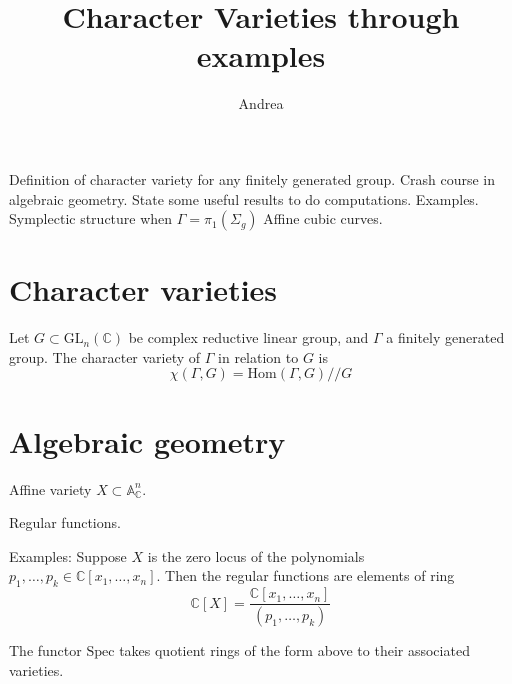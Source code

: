 
% 



\title{Character Varieties through examples}
\author{Andrea}
\date{}

 
\maketitle

Definition of character variety for any finitely generated group. 
Crash course in algebraic geometry.
State some useful results to do computations. 
Examples. 
Symplectic structure when $ \Gamma = \pi_1 ( \Sigma_g) $
Affine cubic curves. 

\section{Character varieties} %

\begin{definition}
    Let $ G \subset \mathrm{GL}_n (\mathbb{C} ) $ be complex reductive linear group, 
    and $ \Gamma $ a finitely generated group. 
    The character variety of $ \Gamma$ in relation to $G$ is 
    \begin{equation}
        \chi ( \Gamma, G) = \mathrm{Hom}( \Gamma, G) // G 
    \end{equation}
\end{definition}


\section{Algebraic geometry} %

\begin{definition}
    Affine variety  $ X \subset \mathbb{A}_\mathbb{C} ^n $.
\end{definition}

\begin{definition}
    Regular functions. 
\end{definition}

Examples: 
Suppose $X$ is the zero locus of the polynomials $p_1, \dots, p_k \in \mathbb{C} [x_1, \dots, x_n ] $. 
Then the regular functions are elements of ring 
\begin{equation}
    \mathbb{C}  [X] = \frac{\mathbb{C} [x_1, \dots, x_n ] }{(p_1, \dots, p_k)}
\end{equation}

The functor $\mathrm{Spec} $ takes quotient rings of the form above to their associated varieties. 

